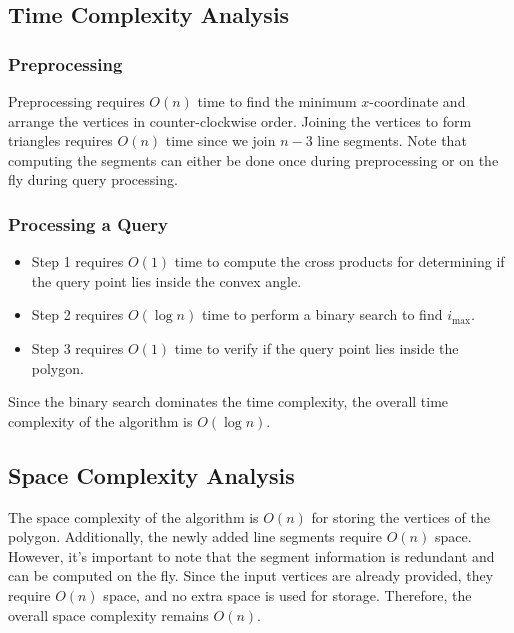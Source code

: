 \documentclass[12pt]{article}
\begin{document}
\subsection*{Time Complexity Analysis}

\subsubsection*{Preprocessing}
 Preprocessing requires \(O(n)\) time to find the minimum \(x\)-coordinate and arrange the vertices in counter-clockwise order. Joining the vertices to form triangles requires \(O(n)\) time since we join \(n-3\) line segments. Note that computing the segments can either be done once during preprocessing or on the fly during query processing.

\subsubsection*{Processing a Query}
\begin{itemize}
        \item Step 1 requires \(O(1)\) time to compute the cross products for determining if the query point lies inside the convex angle.
        \item Step 2 requires \(O(\log n)\) time to perform a binary search to find \(i_{\text{max}}\).
        \item Step 3 requires \(O(1)\) time to verify if the query point lies inside the polygon.
\end{itemize}

Since the binary search dominates the time complexity, the overall time complexity of the algorithm is \(O(\log n)\).

\subsection*{Space Complexity Analysis}
The space complexity of the algorithm is \(O(n)\) for storing the vertices of the polygon. Additionally, the newly added line segments require \(O(n)\) space. However, it's important to note that the segment information is redundant and can be computed on the fly. Since the input vertices are already provided, they require \(O(n)\) space, and no extra space is used for storage. Therefore, the overall space complexity remains \(O(n)\).
\end{document}
